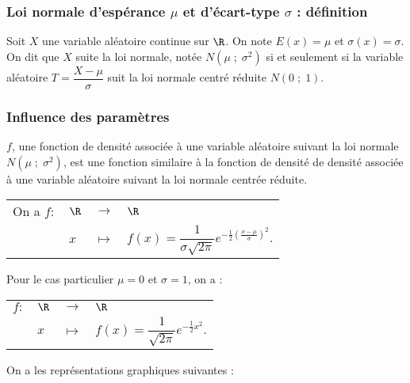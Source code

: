 \subsubsection{Loi normale d'espérance $\mu$ et d'écart-type $\sigma$ : définition}

Soit $X$ une variable aléatoire continue sur $\R$. On note $E\left(x\right) = \mu$ et $\sigma\left(x\right) = \sigma$. \\

On dit que $X$ suite la loi normale, notée $N\left(\mu \; ; \; \sigma^2\right)$ si et seulement si la variable aléatoire $T = \dfrac{X - \mu}{\sigma}$ suit la loi normale centré réduite $N\left(0 \; ; \; 1\right)$.

\subsubsection{Influence des paramètres}

$f$, une fonction de densité associée à une variable aléatoire suivant la loi normale $N\left(\mu \; ; \; \sigma^2\right)$, est une fonction similaire à la fonction de densité de densité associée à une variable aléatoire suivant la loi normale centrée réduite. \\

\begin{tabular}{llll}
\hspace{-.3cm} On a $f:$ & $\R$ & $\longrightarrow$ & $\R$ \\
& $x$ & $\longmapsto$ & $f(x) = \dfrac{1}{\sigma\sqrt{2\pi}}e^{-\frac{1}{2}\left(\frac{x-\mu}{\sigma}\right)^2}$. \\
\end{tabular}

\vspace*{.3cm} 

Pour le cas particulier $\mu = 0$ et $\sigma = 1$, on a : \\

\begin{tabular}{llll}
$f:$ & $\R$ & $\longrightarrow$ & $\R$ \\
& $x$ & $\longmapsto$ & $f(x) = \dfrac{1}{\sqrt{2\pi}}e^{-\frac{1}{2}x^2}$. \\
\end{tabular}

\vspace*{.5cm}

On a les représentations graphiques suivantes : \\

